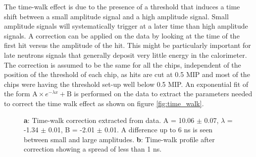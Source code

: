 \documentclass[twoside,a4paper,11pt]{article}
\begin{document}
The time-walk effect is due to the presence of a threshold that induces a time shift between a small amplitude signal and a high amplitude signal. Small amplitude signals will systematically trigger at a later time than high amplitude signals. A correction can be applied on the data by looking at the time of the first hit versus the amplitude of the hit. This might be particularly important for late neutrons signals that generally deposit very little energy in the calorimeter.\\
The correction is assumed to be the same for all the chips, independent of the position of the threshold of each chip, as hits are cut at 0.5 MIP and most of the chips were having the threshold set-up well below 0.5 MIP. An exponential fit of the form $\text{A} \times e^{-\lambda{}x} + \text{B}$ is performed on the data to extract the parameters needed to correct the time walk effect as shown on figure \ref{fig:time_walk}.
\begin{figure}[htbp]
	\hfill
	\caption[]{\textbf{a}: Time-walk correction extracted from data. A = 10.06 $\pm$ 0.07, $\lambda$ = -1.34 $\pm$ 0.01, B = -2.01 $\pm$ 0.01. A difference up to 6 ns is seen between small and large amplitudes. \textbf{b}: Time-walk profile after correction showing a spread of less than 1 ns.}
\end{figure}
\end{document}
